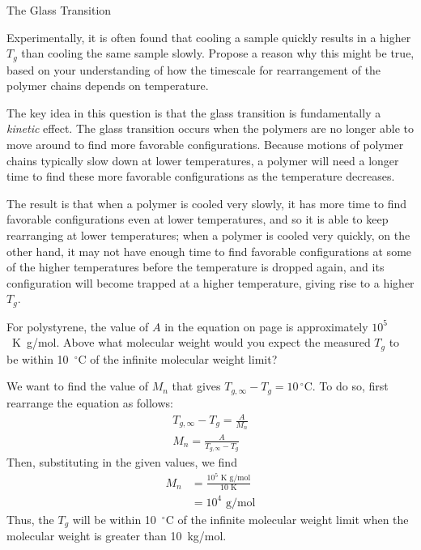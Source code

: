 \begin{activity}{The Glass Transition}
\begin{ctqs}
\end{ctqs}

\begin{exercises}

	\exercise Experimentally, it is often found that cooling a sample quickly results in a higher $T_g$ than cooling the same sample slowly.  Propose a reason why this might be true, based on your understanding of how the timescale for rearrangement of the polymer chains depends on temperature.
	
		\begin{solution}{}
		
			The key idea in this question is that the glass transition is fundamentally a \emph{kinetic} effect.  The glass transition occurs when the polymers are no longer able to move around to find more favorable configurations.  Because motions of polymer chains typically slow down at lower temperatures, a polymer will need a longer time to find these more favorable configurations as the temperature decreases.
			
			The result is that when a polymer is cooled very slowly, it has more time to find favorable configurations even at lower temperatures, and so it is able to keep rearranging at lower temperatures; when a polymer is cooled very quickly, on the other hand, it may not have enough time to find favorable configurations at some of the higher temperatures before the temperature is dropped again, and its configuration will become trapped at a higher temperature, giving rise to a higher $T_g$.
		
		\end{solution}
	
	\exercise For polystyrene, the value of $A$ in the equation on page \pageref{\labelbase:eqn:Mn} is approximately $10^5$~K~g/mol.  Above what molecular weight would you expect the measured $T_g$ to be within 10~$^\circ$C of the infinite molecular weight limit?
	
		\begin{solution}{}
			We want to find the value of $M_n$ that gives $T_{g,\infty} - T_g=10\,{}^\circ$C.  To do so, first rearrange the equation as follows:
			\begin{align*}
				T_{g,\infty} - T_g = \frac{A}{M_n}\\
				M_n = \frac{A}{T_{g,\infty} - T_g}
			\end{align*}
			Then, substituting in the given values, we find
			\begin{align*}
				M_n &= \frac{10^5\text{ K g/mol}}{10\text{ K}}\\
					&= 10^4\text{ g/mol}
			\end{align*}
			Thus, the $T_g$ will be within 10~$^\circ$C of the infinite molecular weight limit when the molecular weight is greater than 10~kg/mol.
		\end{solution}
	

\end{exercises}
\end{activity}
